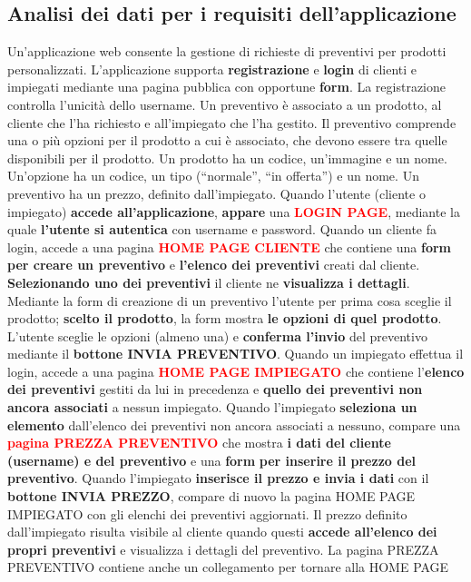 \documentclass[a4paper, 12pt]{article}
\begin{document}
\subsection{Analisi dei dati per i requisiti dell'applicazione} \label{sub: Analisi dei dati per i requisiti dell'applicazione}
Un’applicazione web consente la gestione di richieste di preventivi per prodotti personalizzati. L’applicazione supporta \textbf{\textcolor{myBrown}{registrazione}} e \textbf{\textcolor{myBrown}{login}} di clienti e impiegati mediante una pagina pubblica con opportune \textbf{\textcolor{myGreen}{form}}. La registrazione controlla l’unicità dello username. Un preventivo è associato a un prodotto, al cliente che l’ha richiesto e all’impiegato che l’ha gestito. Il preventivo comprende una o più opzioni per il prodotto a cui è associato, che devono essere tra quelle disponibili per il prodotto. Un prodotto ha un codice, un’immagine e un nome. Un’opzione ha un codice, un tipo (“normale”, “in offerta”) e un nome. Un preventivo ha un prezzo, definito dall’impiegato. Quando l’utente (cliente o impiegato) \textbf{\textcolor{myBlue}{accede all’applicazione}}, \textbf{\textcolor{myBrown}{appare}} una \textbf{\textcolor{red}{LOGIN PAGE}}, mediante la quale \textbf{\textcolor{myBlue}{l’utente si autentica}} con username e password. Quando un cliente fa login, accede a una pagina \textbf{\textcolor{red}{HOME PAGE CLIENTE}} che contiene una \textbf{\textcolor{myGreen}{form}} \textbf{\textcolor{myBrown}{per creare un preventivo}} e \textbf{\textcolor{myGreen}{l’elenco dei preventivi}} creati dal cliente. \textbf{\textcolor{myBlue}{Selezionando uno dei preventivi}} il cliente ne \textbf{\textcolor{myGreen}{visualizza i dettagli}}. Mediante la form di creazione di un preventivo l’utente per prima cosa sceglie il prodotto; \textbf{\textcolor{myBlue}{scelto il prodotto}}, la form mostra \textbf{\textcolor{myGreen}{le opzioni di quel prodotto}}. L’utente sceglie le opzioni (almeno una) e \textbf{\textcolor{myBlue}{conferma l’invio}} del preventivo mediante il \textbf{\textcolor{myGreen}{bottone INVIA PREVENTIVO}}. Quando un impiegato effettua il login, accede a una pagina \textbf{\textcolor{red}{HOME PAGE IMPIEGATO}} che contiene l’\textbf{\textcolor{myGreen}{elenco dei preventivi}} gestiti da lui in precedenza e \textbf{\textcolor{myGreen}{quello dei preventivi non ancora associati}} a nessun impiegato. Quando l’impiegato \textbf{\textcolor{myBlue}{seleziona un elemento}} dall’elenco dei preventivi non ancora associati a nessuno, compare una \textbf{\textcolor{red}{pagina PREZZA PREVENTIVO}} che mostra \textbf{\textcolor{myGreen}{i dati del cliente (username) e del preventivo}} e una \textbf{\textcolor{myGreen}{form}} \textbf{\textcolor{myBrown}{per inserire il prezzo del preventivo}}. Quando l’impiegato \textbf{\textcolor{myBlue}{inserisce il prezzo e invia i dati}} con il \textbf{\textcolor{myGreen}{bottone INVIA PREZZO}}, compare di nuovo la pagina HOME PAGE IMPIEGATO con gli elenchi dei preventivi aggiornati. Il prezzo definito dall’impiegato risulta visibile al cliente quando questi \textbf{\textcolor{myBlue}{accede all’elenco dei propri preventivi}} e visualizza i dettagli del preventivo. La pagina PREZZA PREVENTIVO contiene anche un collegamento per tornare alla HOME PAGE 
\end{document}
